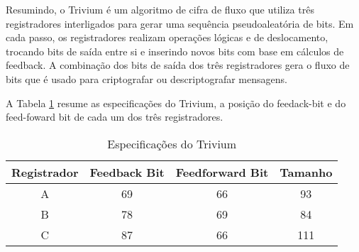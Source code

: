
Resumindo, o Trivium é um algoritmo de cifra de fluxo que utiliza três registradores interligados para gerar uma sequência pseudoaleatória de bits.
Em cada passo, os registradores realizam operações lógicas e de deslocamento, trocando bits de saída entre si e inserindo novos bits com base em cálculos de feedback.
A combinação dos bits de saída dos três registradores gera o fluxo de bits que é usado para criptografar ou descriptografar mensagens.

A Tabela \ref{tab:trivium} resume as especificações do Trivium, a posição do feedack-bit e do feed-foward bit de cada um dos três registradores.

\begin{table}[h!]
  \label{tab:trivium}
\centering
\begin{tabular}{|c|c|c|c|}
\hline
\textbf{Registrador} & \textbf{Feedback Bit} & \textbf{Feedforward Bit} & \textbf{Tamanho} \\
\hline
A & 69 & 66 & 93 \\
\hline
B & 78 & 69 & 84 \\
\hline
C & 87 & 66 & 111 \\
\hline
\end{tabular}
\caption{Especificações do Trivium}
\end{table}

